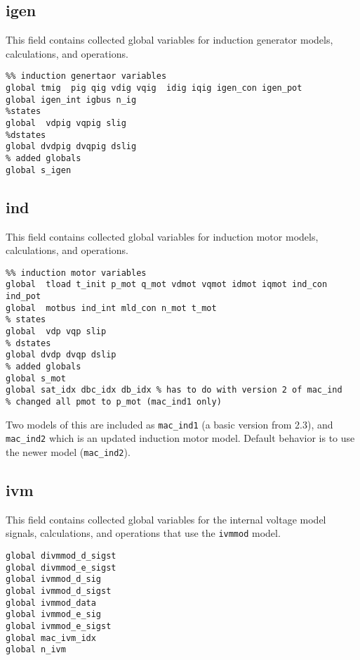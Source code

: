 \subsection{igen}
This field contains collected global variables for induction generator models, calculations, and operations.
\begin{verbatim}
%% induction genertaor variables 
global tmig  pig qig vdig vqig  idig iqig igen_con igen_pot
global igen_int igbus n_ig
%states
global  vdpig vqpig slig
%dstates
global dvdpig dvqpig dslig
% added globals
global s_igen
\end{verbatim}


\subsection{ind}
This field contains collected global variables for induction motor models, calculations, and operations.
\begin{verbatim}
%% induction motor variables
global  tload t_init p_mot q_mot vdmot vqmot idmot iqmot ind_con ind_pot
global  motbus ind_int mld_con n_mot t_mot
% states
global  vdp vqp slip
% dstates
global dvdp dvqp dslip
% added globals
global s_mot
global sat_idx dbc_idx db_idx % has to do with version 2 of mac_ind
% changed all pmot to p_mot (mac_ind1 only)
\end{verbatim}

Two models of this are included as \verb|mac_ind1| (a basic version from 2.3), and \verb|mac_ind2| which is an updated induction motor model. Default behavior is to use the newer model (\verb|mac_ind2|).

\subsection{ivm} 
This field contains collected global variables for the internal voltage model signals, calculations, and operations that use the \verb|ivmmod| model.
\begin{verbatim}
global divmmod_d_sigst
global divmmod_e_sigst
global ivmmod_d_sig
global ivmmod_d_sigst
global ivmmod_data
global ivmmod_e_sig
global ivmmod_e_sigst
global mac_ivm_idx
global n_ivm
\end{verbatim}

